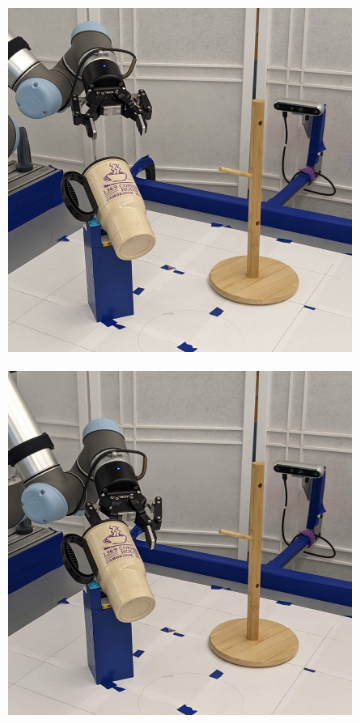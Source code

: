 \documentclass{article}
\begin{document}
\begin{figure}[]
\begin{subfigure}{(\linewidth - 0.05\linewidth)/5}
    \end{subfigure}
    \begin{subfigure}{(\linewidth - 0.05\linewidth)/5}
        \centering
        \includegraphics[width=\linewidth]{figures/episodes/mug_on_tree_zoom/3.jpg}
    \end{subfigure}
    \begin{subfigure}{(\linewidth - 0.05\linewidth)/5}
        \centering
        \includegraphics[width=\linewidth]{figures/episodes/mug_on_tree_zoom/4.jpg}

\end{subfigure}
\end{figure}
\end{document}

